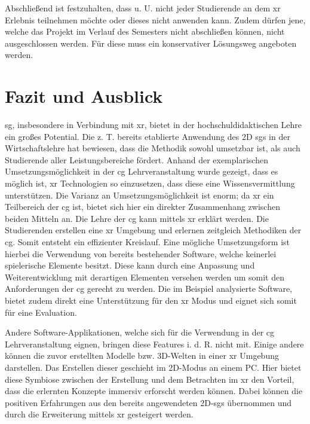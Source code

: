 \documentclass[conference]{IEEEtran}
\begin{document}
Abschließend ist festzuhalten, dass u. U. nicht jeder Studierende an dem \gls{xr} Erlebnis teilnehmen möchte oder dieses nicht anwenden kann. 
Zudem dürfen jene, welche das Projekt im Verlauf des Semesters nicht abschließen können, nicht ausgeschlossen werden.
Für diese muss ein konservativer Lösungsweg angeboten werden.

\section{Fazit und Ausblick}


\gls{sg}, insbesondere in Verbindung mit \gls{xr}, bietet in der hochschuldidaktischen Lehre ein großes Potential.
Die z. T. bereits etablierte Anwendung des 2D \gls{sg}s in der Wirtschaftslehre hat bewiesen, 
dass die Methodik sowohl umsetzbar ist, als auch Studierende aller Leistungsbereiche fördert. 
Anhand der exemplarischen Umsetzungsmöglichkeit in der \gls{cg} Lehrveranstaltung wurde gezeigt,
dass es möglich ist, \gls{xr} Technologien so einzusetzen, dass diese eine Wissensvermittlung unterstützen. 
Die Varianz an Umsetzungsmöglichkeit ist enorm; 
da \gls{xr} ein Teilbereich der \gls{cg} ist, bietet sich hier ein direkter Zusammenhang zwischen beiden Mitteln an.
Die Lehre der \gls{cg} kann mittels \gls{xr} erklärt werden.
Die Studierenden erstellen eine \gls{xr} Umgebung und erlernen zeitgleich Methodiken der \gls{cg}. 
Somit entsteht ein effizienter Kreislauf. 
Eine mögliche Umsetzungsform ist hierbei die Verwendung von bereits bestehender Software, welche keinerlei spielerische Elemente besitzt.
Diese kann durch eine Anpassung und Weiterentwicklung mit derartigen Elementen versehen werden um somit den Anforderungen der \gls{cg} gerecht zu werden.
Die im Beispiel analysierte Software, bietet zudem direkt eine Unterstützung für den \gls{xr} Modus und eignet sich somit für eine Evaluation.

Andere Software-Applikationen, welche sich für die Verwendung in der \gls{cg} Lehrveranstaltung eignen, bringen diese Features i. d. R. nicht mit.
Einige andere können die zuvor erstellten Modelle bzw. 3D-Welten in einer \gls{xr} Umgebung darstellen.
Das Erstellen dieser geschieht im 2D-Modus an einem PC.
Hier bietet diese Symbiose zwischen der Erstellung und dem Betrachten im \gls{xr} den Vorteil, dass die erlernten Konzepte immersiv erforscht werden können.
Dabei können die positiven Erfahrungen aus den bereits angewendeten 2D-\gls{sg}s übernommen und durch die Erweiterung mittels \gls{xr} gesteigert werden.
\end{document}

